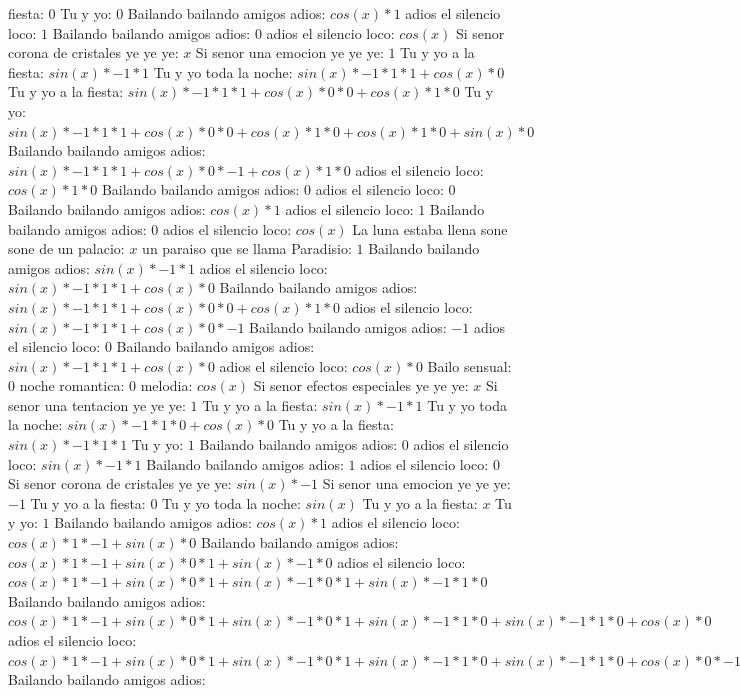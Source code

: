 \documentclass{article}
\begin{document}
fiesta: $0$ Tu y yo: $0$  \newline Bailando bailando amigos adios: $cos(x)*1$ adios el silencio loco: $1$ Bailando bailando amigos adios: $0$  \newline adios el silencio loco: $cos(x)$  \newline Si senor corona de cristales ye ye ye: $x$ Si senor una emocion ye ye ye: $1$  \newline Tu y yo a la fiesta: $sin(x)*-1*1$ Tu y yo toda la noche: $sin(x)*-1*1*1+cos(x)*0$ Tu y yo a la fiesta: ${sin(x)*-1*1*1+cos(x)*0}*0+cos(x)*1*0$ Tu y yo: ${sin(x)*-1*1*1+cos(x)*0}*0+cos(x)*1*0+cos(x)*1*0+sin(x)*0$ Bailando bailando amigos adios: ${sin(x)*-1*1*1+cos(x)*0}*-1+cos(x)*1*0$  \newline adios el silencio loco: $cos(x)*1*0$ Bailando bailando amigos adios: $0$ adios el silencio loco: $0$  \newline Bailando bailando amigos adios: $cos(x)*1$ adios el silencio loco: $1$ Bailando bailando amigos adios: $0$  \newline adios el silencio loco: $cos(x)$  \newline La luna estaba llena sone sone de un palacio: $x$ un paraiso que se llama Paradisio: $1$  \newline Bailando bailando amigos adios: $sin(x)*-1*1$ adios el silencio loco: $sin(x)*-1*1*1+cos(x)*0$ Bailando bailando amigos adios: ${sin(x)*-1*1*1+cos(x)*0}*0+cos(x)*1*0$ adios el silencio loco: ${sin(x)*-1*1*1+cos(x)*0}*-1$ Bailando bailando amigos adios: $-1$ adios el silencio loco: $0$  \newline Bailando bailando amigos adios: $sin(x)*-1*1*1+cos(x)*0$  \newline adios el silencio loco: $cos(x)*0$ Bailo sensual: $0$ noche romantica: $0$  \newline melodia: $cos(x)$  \newline Si senor efectos especiales ye ye ye: $x$ Si senor una tentacion ye ye ye: $1$  \newline Tu y yo a la fiesta: $sin(x)*-1*1$ Tu y yo toda la noche: $sin(x)*-1*1*0+cos(x)*0$ Tu y yo a la fiesta: $sin(x)*-1*1*1$ Tu y yo: $1$ Bailando bailando amigos adios: $0$  \newline adios el silencio loco: $sin(x)*-1*1$ Bailando bailando amigos adios: $1$ adios el silencio loco: $0$  \newline Si senor corona de cristales ye ye ye: $sin(x)*-1$ Si senor una emocion ye ye ye: $-1$ Tu y yo a la fiesta: $0$  \newline Tu y yo toda la noche: $sin(x)$  \newline Tu y yo a la fiesta: $x$ Tu y yo: $1$  \newline Bailando bailando amigos adios: $cos(x)*1$ adios el silencio loco: $cos(x)*1*-1+sin(x)*0$ Bailando bailando amigos adios: ${cos(x)*1*-1+sin(x)*0}*1+sin(x)*-1*0$ adios el silencio loco: ${{cos(x)*1*-1+sin(x)*0}*1+sin(x)*-1*0}*1+sin(x)*-1*1*0$ Bailando bailando amigos adios: ${{cos(x)*1*-1+sin(x)*0}*1+sin(x)*-1*0}*1+sin(x)*-1*1*0+sin(x)*-1*1*0+cos(x)*0$ adios el silencio loco: ${{{cos(x)*1*-1+sin(x)*0}*1+sin(x)*-1*0}*1+sin(x)*-1*1*0+sin(x)*-1*1*0+cos(x)*0}*-1+{sin(x)*-1*1*1+cos(x)*0}*0$ Bailando bailando amigos adios: 
\end{document}
